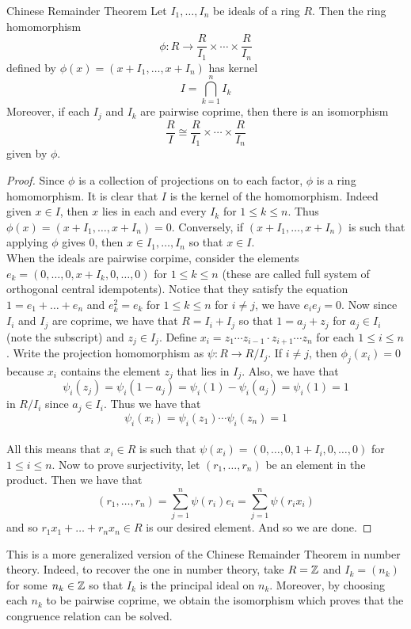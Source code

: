 \documentclass[a4paper]{article}
\begin{document}
\begin{thm}{Chinese Remainder Theorem}{} Let $I_1,\dots, I_n$ be ideals of a ring $R$. Then the ring homomorphism $$\phi:R\to\frac{R}{I_1}\times\cdots\times\frac{R}{I_n}$$ defined by $\phi(x)=(x+I_1,\dots,x+I_n)$ has kernel $$I=\bigcap_{k=1}^nI_k$$ Moreover, if each $I_j$ and $I_k$ are pairwise coprime, then there is an isomorphism $$\frac{R}{I}\cong\frac{R}{I_1}\times\cdots\times\frac{R}{I_n}$$ given by $\phi$. 
\begin{proof}
Since $\phi$ is a collection of projections on to each factor, $\phi$ is a ring homomorphism. It is clear that $I$ is the kernel of the homomorphism. Indeed given $x\in I$, then $x$ lies in each and every $I_k$ for $1\leq k\leq n$. Thus $\phi(x)=(x+I_1,\dots,x+I_n)=0$. Conversely, if $(x+I_1,\dots,x+I_n)$ is such that applying $\phi$ gives $0$, then $x\in I_1,\dots,I_n$ so that $x\in I$. \\

When the ideals are pairwise corpime, consider the elements $e_k=(0,\dots,0,x+I_k,0,\dots,0)$ for $1\leq k\leq n$ (these are called full system of orthogonal central idempotents). Notice that they satisfy the equation $1=e_1+\dots+e_n$ and $e_k^2=e_k$ for $1\leq k\leq n$ for $i\neq j$, we have $e_ie_j=0$. Now since $I_i$ and $I_j$ are coprime, we have that $R=I_i+I_j$ so that $1=a_j+z_j$ for $a_j\in I_i$ (note the subscript) and $z_j\in I_j$. Define $x_i=z_1\cdots z_{i-1}\cdot z_{i+1}\cdots z_n$ for each $1\leq i\leq n$. Write the projection homomorphism as $\psi:R\to R/I_j$. If $i\neq j$, then $\phi_j(x_i)=0$ because $x_i$ contains the element $z_j$ that lies in $I_j$. Also, we have that $$\psi_i(z_j)=\psi_i(1-a_j)=\psi_i(1)-\psi_i(a_j)=\psi_i(1)=1$$ in $R/I_i$ since $a_j\in I_i$. Thus we have that $$\psi_i(x_i)=\psi_i(z_1)\cdots\psi_i(z_n)=1$$~\\

All this means that $x_i\in R$ is such that $\psi(x_i)=(0,\dots,0,1+I_i,0,\dots,0)$ for $1\leq i\leq n$. Now to prove surjectivity, let $(r_1,\dots,r_n)$ be an element in the product. Then we have that $$(r_1,\dots,r_n)=\sum_{j=1}^n\psi(r_i)e_i=\sum_{j=1}^n\psi(r_ix_i)$$ and so $r_1x_1+\dots+r_nx_n\in R$ is our desired element. And so we are done. 
\end{proof}
\end{thm}

This is a more generalized version of the Chinese Remainder Theorem in number theory. Indeed, to recover the one in number theory, take $R=\mathbb{Z}$ and $I_k=(n_k)$ for some $n_k\in\mathbb{Z}$ so that $I_k$ is the principal ideal on $n_k$. Moreover, by choosing each $n_k$ to be pairwise coprime, we obtain the isomorphism which proves that the congruence relation can be solved. \\
\end{document}

